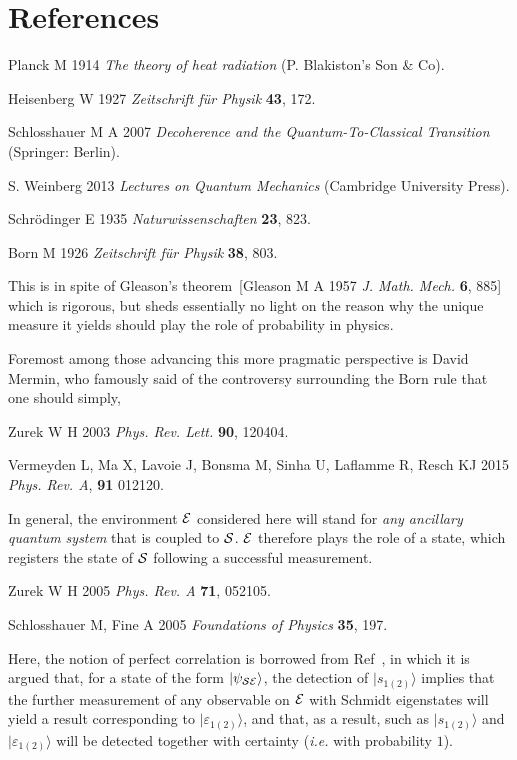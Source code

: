\documentclass[12pt]{iopart}
\begin{document}
\section*{References}
\begin{thebibliography}{99}


Planck M 1914 \textit{The theory of heat radiation} (P. Blakiston's Son \& Co).

Heisenberg W 1927 \textit{Zeitschrift f\"ur Physik} {\bf 43}, 172.

Schlosshauer M A 2007 \textit{Decoherence and the Quantum-To-Classical Transition} (Springer: Berlin).

S. Weinberg 2013 \textit{Lectures on Quantum Mechanics} (Cambridge University Press).

Schr\"odinger E 1935 \textit{Naturwissenschaften} {\bf 23}, 823.

Born M 1926 \textit{Zeitschrift f\"ur Physik}  {\bf 38}, 803.

This is in spite of Gleason's theorem~[Gleason M A 1957 \textit{J. Math. Mech.} {\bf 6}, 885] which is rigorous, but sheds essentially no light on the reason why the unique measure it yields should play the role of probability in physics.

Foremost among those advancing this more pragmatic perspective is David Mermin, who famously said of the controversy surrounding the Born rule that one should simply, 

Zurek W H 2003 \textit{Phys. Rev. Lett.} {\bf 90}, 120404.

Vermeyden L, Ma X, Lavoie J, Bonsma M, Sinha U, Laflamme R, Resch KJ 2015 \textit{Phys. Rev. A}, {\bf 91} 012120.

{In general, the environment ${\cal E}$ considered here will stand for \textit{any ancillary quantum system} that is coupled to ${\cal S}$. ${\cal E}$ therefore plays the role of a  state, which registers the state of ${\cal S}$ following a successful measurement.}

Zurek W H 2005 \textit{Phys. Rev. A} {\bf 71}, 052105.

Schlosshauer M, Fine A 2005 \textit{Foundations of Physics} {\bf 35}, 197.

Here, the notion of perfect correlation is borrowed from Ref~\cite{zurek:05}, in which it is argued that, for a state of the form  $|\psi_{\cal SE}\rangle$, the detection of $|s_{1(2)}\rangle$ implies that the further measurement of any observable on ${\cal E}$ with Schmidt eigenstates will yield a result corresponding to $|\varepsilon_{1(2)}\rangle$, and that, as a result,  such as $|s_{1(2)}\rangle$ and $|\varepsilon_{1(2)}\rangle$ will be detected together with certainty (\textit{i.e.} with probability $1$). 


\end{thebibliography}
\end{document}
